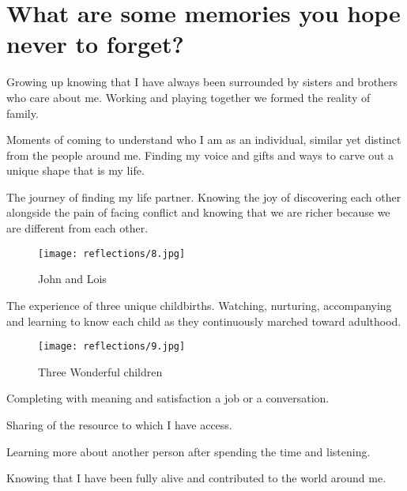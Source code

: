 \section{What are some memories you hope never to forget?}
Growing up knowing that I have always been surrounded by sisters and brothers who care about me.
Working and playing together we formed the reality of family.

Moments of coming to understand who I am as an individual, similar yet distinct from the people around me.
Finding my voice and gifts and ways to carve out a unique shape that is my life.

The journey of finding my life partner.
Knowing the joy of discovering each other alongside the pain of facing conflict and knowing that we are richer because we are different from each other.

\begin{figure}
\centering
\texttt{[image: reflections/8.jpg]}
\caption{
John and Lois
}
\end{figure}

The experience of three unique childbirths.
Watching, nurturing, accompanying and learning to know each child as they continuously marched toward adulthood.

\begin{figure}
\centering
\texttt{[image: reflections/9.jpg]}
\caption{
Three Wonderful children
}
\end{figure}


Completing with meaning and satisfaction a job or a conversation.

Sharing of the resource to which I have access.

Learning more about another person after spending the time and listening.

Knowing that I have been fully alive and contributed to the world around me.






